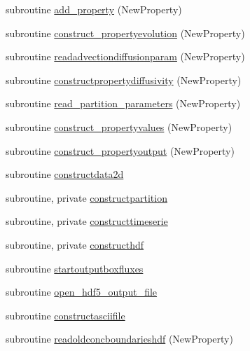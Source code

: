 \begin{DoxyCompactItemize}
subroutine \mbox{\hyperlink{namespacemodulerunoffproperties_af131ec1efa38bd73fc48b57ad5a02e86}{add\+\_\+property}} (New\+Property)
\item 
subroutine \mbox{\hyperlink{namespacemodulerunoffproperties_aa934a2b16151c8ba36343b555f143da8}{construct\+\_\+propertyevolution}} (New\+Property)
\item 
subroutine \mbox{\hyperlink{namespacemodulerunoffproperties_ade7661d1679610044a3f568f06610532}{readadvectiondiffusionparam}} (New\+Property)
\item 
subroutine \mbox{\hyperlink{namespacemodulerunoffproperties_abe332d8f07a02030f5b0712c32f01262}{constructpropertydiffusivity}} (New\+Property)
\item 
subroutine \mbox{\hyperlink{namespacemodulerunoffproperties_ab3fc52402148877652dc3cb453fd27be}{read\+\_\+partition\+\_\+parameters}} (New\+Property)
\item 
subroutine \mbox{\hyperlink{namespacemodulerunoffproperties_a72bab581ca5f460f8d99af192c79b0ed}{construct\+\_\+propertyvalues}} (New\+Property)
\item 
subroutine \mbox{\hyperlink{namespacemodulerunoffproperties_aaad69eea7f005151f91a94b3105aed34}{construct\+\_\+propertyoutput}} (New\+Property)
\item 
subroutine \mbox{\hyperlink{namespacemodulerunoffproperties_a3a9583323dea60d8001dd48bf958642e}{constructdata2d}}
\item 
subroutine, private \mbox{\hyperlink{namespacemodulerunoffproperties_ac7e05edd5458dddb9680976873653eec}{constructpartition}}
\item 
subroutine, private \mbox{\hyperlink{namespacemodulerunoffproperties_a00eb7dbee6a76f3b846621e0aad282c0}{constructtimeserie}}
\item 
subroutine, private \mbox{\hyperlink{namespacemodulerunoffproperties_ab553b53f61f80a77a664735dc1b72d44}{constructhdf}}
\item 
subroutine \mbox{\hyperlink{namespacemodulerunoffproperties_a06106b336b804481c4fd8b518bb683fe}{startoutputboxfluxes}}
\item 
subroutine \mbox{\hyperlink{namespacemodulerunoffproperties_a4ef5ab78c07d6707611f74abfd05eab1}{open\+\_\+hdf5\+\_\+output\+\_\+file}}
\item 
subroutine \mbox{\hyperlink{namespacemodulerunoffproperties_a45fc4e5579efd1a6fc669b8461d2b427}{constructasciifile}}
\item 
subroutine \mbox{\hyperlink{namespacemodulerunoffproperties_a51f42b03c77afc107222186d842f228e}{readoldconcboundarieshdf}} (New\+Property)

\end{DoxyCompactItemize}
